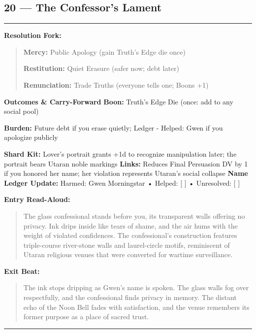 \documentclass[18pt, letterpaper, twoside]{article}
\newenvironment{floorbox}[1]{%
    \begin{center}
    \begin{minipage}{0.95\textwidth}
    \subsection*{#1}
    \vspace{-0.5em}
    \rule{\textwidth}{0.5pt}
    \vspace{0.5em}
}{%
    \vspace{0.5em}
    \rule{\textwidth}{0.5pt}
    \end{minipage}
    \end{center}
}
\newenvironment{resolutionbox}{%
    \vspace{0.5em}
    \noindent\textbf{Resolution Fork:}
    \begin{quote}
}{%
    \end{quote}
    \vspace{0.5em}
}
\newenvironment{boxedtext}[1]{%
    \vspace{0.5em}
    \noindent\textbf{#1}
    \begin{quote}
}{%
    \end{quote}
    \vspace{0.5em}
}
\newcommand{\boon}[1]{\noindent\textbf{Boon:} #1\par}
\newcommand{\burden}[1]{\noindent\textbf{Burden:} #1\par}
\newcommand{\entrytext}[1]{\begin{boxedtext}{Entry Read-Aloud:} #1 \end{boxedtext}}
\newcommand{\exittext}[1]{\begin{boxedtext}{Exit Beat:} #1 \end{boxedtext}}
\begin{document}
\begin{floorbox}{20 --- The Confessor's Lament}
\begin{resolutionbox}
\textbf{Mercy:} Public Apology (gain Truth's Edge die once)

\textbf{Restitution:} Quiet Erasure (safer now; debt later)

\textbf{Renunciation:} Trade Truths (everyone tells one; Boons +1)
\end{resolutionbox}

\textbf{Outcomes \& Carry-Forward}
\boon{Truth's Edge Die (once: add to any social pool)}
\burden{Future debt if you erase quietly; Ledger - Helped: Gwen if you apologize publicly}
\textbf{Shard Kit:} Lover's portrait grants +1d to recognize manipulation later; the portrait bears Utaran noble markings
\textbf{Links:} Reduces Final Persuasion DV by 1 if you honored her name; her violation represents Utaran's social collapse
\textbf{Name Ledger Update:} Harmed: Gwen Morningstar • Helped: [ ] • Unresolved: [ ]

\entrytext{The glass confessional stands before you, its transparent walls offering no privacy. Ink drips inside like tears of shame, and the air hums with the weight of violated confidences. The confessional's construction features triple-course river-stone walls and laurel-circle motifs, reminiscent of Utaran religious venues that were converted for wartime surveillance.}

\exittext{The ink stops dripping as Gwen's name is spoken. The glass walls fog over respectfully, and the confessional finds privacy in memory. The distant echo of the Noon Bell fades with satisfaction, and the venue remembers its former purpose as a place of sacred trust.}
\end{floorbox}
\end{document}

